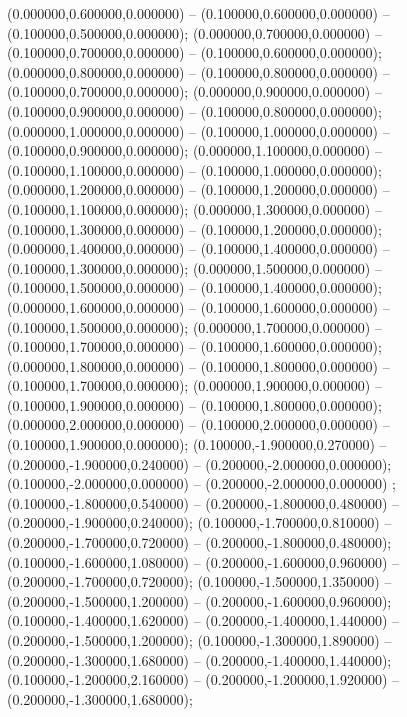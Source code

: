  (0.000000,0.600000,0.000000) -- (0.100000,0.600000,0.000000) -- (0.100000,0.500000,0.000000);
 (0.000000,0.700000,0.000000) -- (0.100000,0.700000,0.000000) -- (0.100000,0.600000,0.000000);
 (0.000000,0.800000,0.000000) -- (0.100000,0.800000,0.000000) -- (0.100000,0.700000,0.000000);
 (0.000000,0.900000,0.000000) -- (0.100000,0.900000,0.000000) -- (0.100000,0.800000,0.000000);
 (0.000000,1.000000,0.000000) -- (0.100000,1.000000,0.000000) -- (0.100000,0.900000,0.000000);
 (0.000000,1.100000,0.000000) -- (0.100000,1.100000,0.000000) -- (0.100000,1.000000,0.000000);
 (0.000000,1.200000,0.000000) -- (0.100000,1.200000,0.000000) -- (0.100000,1.100000,0.000000);
 (0.000000,1.300000,0.000000) -- (0.100000,1.300000,0.000000) -- (0.100000,1.200000,0.000000);
 (0.000000,1.400000,0.000000) -- (0.100000,1.400000,0.000000) -- (0.100000,1.300000,0.000000);
 (0.000000,1.500000,0.000000) -- (0.100000,1.500000,0.000000) -- (0.100000,1.400000,0.000000);
 (0.000000,1.600000,0.000000) -- (0.100000,1.600000,0.000000) -- (0.100000,1.500000,0.000000);
 (0.000000,1.700000,0.000000) -- (0.100000,1.700000,0.000000) -- (0.100000,1.600000,0.000000);
 (0.000000,1.800000,0.000000) -- (0.100000,1.800000,0.000000) -- (0.100000,1.700000,0.000000);
 (0.000000,1.900000,0.000000) -- (0.100000,1.900000,0.000000) -- (0.100000,1.800000,0.000000);
 (0.000000,2.000000,0.000000) -- (0.100000,2.000000,0.000000) -- (0.100000,1.900000,0.000000);
 (0.100000,-1.900000,0.270000) -- (0.200000,-1.900000,0.240000) -- (0.200000,-2.000000,0.000000);
 (0.100000,-2.000000,0.000000) -- (0.200000,-2.000000,0.000000) ;
 (0.100000,-1.800000,0.540000) -- (0.200000,-1.800000,0.480000) -- (0.200000,-1.900000,0.240000);
 (0.100000,-1.700000,0.810000) -- (0.200000,-1.700000,0.720000) -- (0.200000,-1.800000,0.480000);
 (0.100000,-1.600000,1.080000) -- (0.200000,-1.600000,0.960000) -- (0.200000,-1.700000,0.720000);
 (0.100000,-1.500000,1.350000) -- (0.200000,-1.500000,1.200000) -- (0.200000,-1.600000,0.960000);
 (0.100000,-1.400000,1.620000) -- (0.200000,-1.400000,1.440000) -- (0.200000,-1.500000,1.200000);
 (0.100000,-1.300000,1.890000) -- (0.200000,-1.300000,1.680000) -- (0.200000,-1.400000,1.440000);
 (0.100000,-1.200000,2.160000) -- (0.200000,-1.200000,1.920000) -- (0.200000,-1.300000,1.680000);
